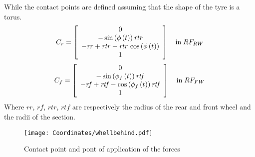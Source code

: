%
While the contact points are defined assuming that the shape of the tyre is a torus. 
%
\begin{equation}
C_r =  \left[ \begin {array}{c} 0\\ 
-\sin \left( \phi
\left( t \right)  \right) {\it rtr}\\ 
-{\it rr}+{
\it rtr}-{\it rtr}\,\cos \left( \phi \left( t \right)  \right)\\ 
1\end {array} \right] 
\quad \text{in} \; RF_{RW}
\end{equation}
%
\begin{equation}
C_f =  \left[ \begin {array}{c} 0\\ 
-\sin \left( \phi_{f}
\left( t \right)  \right) {\it rtf}\\ 
-{\it rf}+{
\it rtf}-\cos \left( \phi_{f} \left( t \right)  \right) {\it rtf}\\
1\end {array} \right] 
\quad \text{in} \; RF_{FW}
\end{equation}
%
Where $rr$, $rf$, $rtr$, $rtf$ are respectively the radius of the rear and front wheel and the radii of the section.
%
\begin{figure}[h!]
    \centering
    \texttt{[image: Coordinates/whellbehind.pdf]}
    \caption{Contact point and pont of application of the forces}
    \label{fig:PandC}
\end{figure}
%
